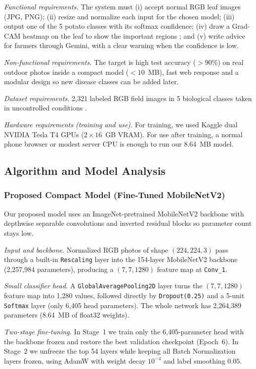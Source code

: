 \textit{Functional requirements.} The system must (i) accept normal RGB leaf images (JPG, PNG); (ii) resize and normalize each input for the chosen model; (iii) output one of the 5 potato classes with its softmax confidence; (iv) draw a Grad-CAM heatmap on the leaf to show the important regions \cite{selvaraju2017grad}; and (v) write advice for farmers through Gemini, with a clear warning when the confidence is low.

\textit{Non-functional requirements.} The target is high test accuracy ($>90\%$) on real outdoor photos inside a compact model ($<10$~MB), fast web response and a modular design so new disease classes can be added later.

\textit{Dataset requirements.} 2,321 labeled RGB field images in 5 biological classes taken in uncontrolled conditions \cite{shabrina2024novel}.

\textit{Hardware requirements (training and use).} For training, we used Kaggle dual NVIDIA Tesla T4 GPUs ($2 \times 16$~GB VRAM). For use after training, a normal phone browser or modest server CPU is enough to run our 8.64~MB model.

\subsection{Algorithm and Model Analysis}

\subsubsection{Proposed Compact Model (Fine-Tuned MobileNetV2)}
Our proposed model uses an ImageNet-pretrained MobileNetV2 backbone \cite{sandler2018mobilenetv2} with depthwise separable convolutions and inverted residual blocks so parameter count stays low.

\textit{Input and backbone.} Normalized RGB photos of shape $(224, 224, 3)$ pass through a built-in \texttt{Rescaling} layer into the 154-layer MobileNetV2 backbone (2,257,984 parameters), producing a $(7, 7, 1280)$ feature map at \texttt{Conv\_1}.

\textit{Small classifier head.} A \texttt{GlobalAveragePooling2D} layer turns the $(7, 7, 1280)$ feature map into 1,280 values, followed directly by \texttt{Dropout(0.25)} and a 5-unit \texttt{Softmax} layer (only 6,405 head parameters). The whole network has 2,264,389 parameters (8.64~MB of float32 weights).

\textit{Two-stage fine-tuning.} In Stage~1 we train only the 6,405-parameter head with the backbone frozen and restore the best validation checkpoint (Epoch~6). In Stage~2 we unfreeze the top 54 layers while keeping all Batch Normalization layers frozen, using AdamW with weight decay $10^{-4}$ and label smoothing $0.05$.

